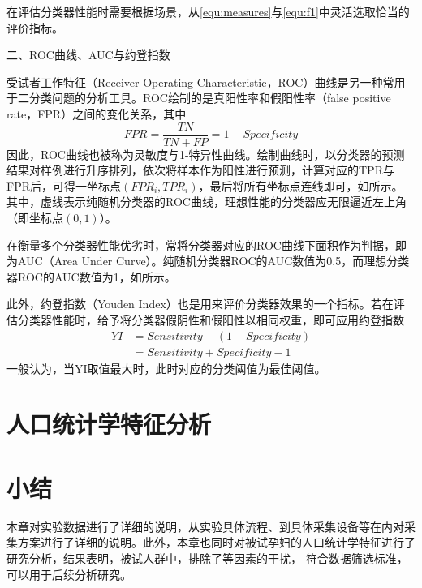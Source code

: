 在评估分类器性能时需要根据场景，从\autoref{equ:measures}与\autoref{equ:f1}中灵活选取恰当的评价指标。

二、ROC曲线、AUC与约登指数

受试者工作特征（Receiver Operating Characteristic，ROC）曲线是另一种常用于二分类问题的分析工具。ROC绘制的是真阳性率和假阳性率（false positive rate，FPR）之间的变化关系，其中
\begin{equation}
      \label{equ:fpr}
      FPR=\frac{TN}{TN+FP}=1-Specificity
\end{equation}
因此，ROC曲线也被称为灵敏度与1-特异性曲线。绘制曲线时，以分类器的预测结果对样例进行升序排列，依次将样本作为阳性进行预测，计算对应的TPR与FPR后，可得一坐标点$({FPR}_i,{TPR}_i)$，最后将所有坐标点连线即可，如所示。
其中，虚线表示纯随机分类器的ROC曲线，理想性能的分类器应无限逼近左上角（即$\text{坐标点}(0,1)$）。

在衡量多个分类器性能优劣时，常将分类器对应的ROC曲线下面积作为判据，即为AUC（Area Under Curve）。纯随机分类器ROC的AUC数值为0.5，而理想分类器ROC的AUC数值为1，如所示。

此外，约登指数（Youden Index）也是用来评价分类器效果的一个指标。若在评估分类器性能时，给予将分类器假阴性和假阳性以相同权重，即可应用约登指数
\begin{equation}
      \label{equ:yi}
      \begin{aligned}
            YI&=Sensitivity-(1-Specificity)\\
            &=Sensitivity+Specificity-1
      \end{aligned}
\end{equation}
一般认为，当YI取值最大时，此时对应的分类阈值为最佳阈值\cite{cwl}。

\section{人口统计学特征分析}

\section{小结}
本章对实验数据进行了详细的说明，从实验具体流程、到具体采集设备等在内对采集方案进行了详细的说明。此外，本章也同时对被试孕妇的人口统计学特征进行了研究分析，结果表明，被试人群中，排除了等因素的干扰，
符合数据筛选标准，可以用于后续分析研究。  